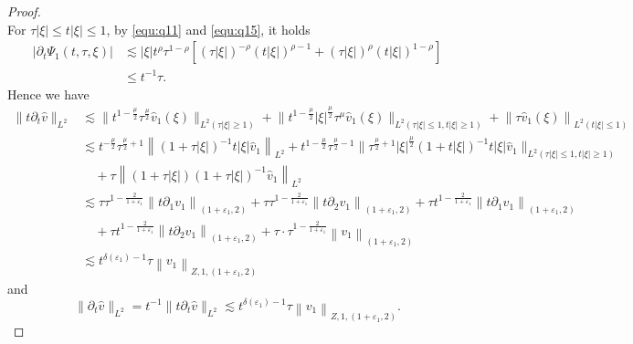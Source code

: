 \documentclass[11pt,twoside]{article}
\newcommand{\p}{\partial}
\newcommand{\f}{\frac}
\theoremstyle{plain}
\theoremstyle{definition}
\theoremstyle{remark}
\numberwithin{equation}{section}
\begin{document}
\begin{proof}
\begin{equation}
\end{equation}
For $\tau|\xi|\leq t|\xi|\leq 1$, by \eqref{equ:q11} and \eqref{equ:q15}, it holds
\begin{equation}\label{equ:l12}
\begin{aligned}
\left|\p_t\Psi_1(t, \tau, \xi)\right| & \lesssim |\xi| t^\rho\tau^{1-\rho}\left[(\tau|\xi|)^{-\rho}(t|\xi|)^{\rho-1}+(\tau|\xi|)^{\rho}(t|\xi|)^{1-\rho}\right]\\
& \leq t^{-1}\tau.
\end{aligned}
\end{equation}
Hence we have
\begin{equation}\label{equ:l13}
\begin{aligned}
\|t\p_t\hat{v}\|_{L^2} & \lesssim\big\|t^{1-\frac{\mu}{2}} \tau^{\frac{\mu}{2}} \hat{v}_1(\xi)\big\|_{L^2(\tau|\xi| \geqslant 1)}+\big\|t^{1-\frac{\mu}{2}}|\xi|^{\frac{\mu}{2}} \tau^\mu \hat{v}_1(\xi)\big\|_{L^2(\tau|\xi| \leqslant 1, t|\xi| \geqslant 1)}+\left\|\tau \hat{v}_1(\xi)\right\|_{L^2(t|\xi| \leqslant 1)} \\
& \lesssim t^{-\frac{\mu}{2}} \tau^{\frac{\mu}{2}+1} \left\|(1+\tau|\xi|)^{-1} t|\xi| \hat{v}_1\right\|_{L^2}+t^{1-\f{\mu}{2}}\tau^{\f{\mu}{2}-1}\big\|\tau^{\f{\mu}{2}+1}|\xi|^{\f{\mu}{2}}(1+t|\xi|)^{-1} t|\xi|\hat{v}_1\big\|_{L^2(\tau|\xi| \leqslant 1, t|\xi| \geqslant 1)}\\
&\quad+\tau\left\|(1+\tau|\xi|)(1+\tau|\xi|)^{-1} \hat{v}_1\right\|_{L^2} \\
& \lesssim \tau \tau^{1-\frac{2}{1+\varepsilon_1}} \left\|t\p_1v_1\right\|_{\left(1+\varepsilon_1, 2\right)}+\tau \tau^{1-\frac{2}{1+\varepsilon_1}} \left\|t\p_2v_1\right\|_{\left(1+\varepsilon_1, 2\right)}+\tau t^{1-\frac{2}{1+\varepsilon_1}}\left\|t\p_1v_1\right\|_{\left(1+\varepsilon_1, 2\right)}\\
&\quad+\tau t^{1-\frac{2}{1+\varepsilon_1}}\left\|t\p_2v_1\right\|_{\left(1+\varepsilon_1, 2\right)}+\tau \cdot \tau^{1-\frac{2}{1+\varepsilon_1}}\left\|v_1\right\|_{\left(1+\varepsilon_1, 2\right)} \\
& \lesssim t^{\delta(\varepsilon_1)-1} \tau\left\|v_1\right\|_{Z, 1, \left(1+\varepsilon_1, 2\right)}
\end{aligned}
\end{equation}
and
\begin{equation}\label{equ:l14}
\|\p_t\hat{v}\|_{L^2}=t^{-1}\|t\p_t\hat{v}\|_{L^2}
 \lesssim t^{\delta(\varepsilon_1)-1} \tau\left\|v_1\right\|_{Z, 1, \left(1+\varepsilon_1, 2\right)}.
\end{equation}

\end{proof}
\end{document}
